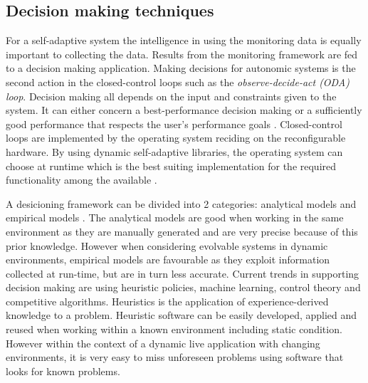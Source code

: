 \subsection{Decision making techniques}
\label{sec:decisions}

For a self-adaptive system the intelligence in using the monitoring data is equally important to collecting the data. Results from the monitoring framework are fed to a decision making application. Making decisions for autonomic systems is the second action in the closed-control loops such as the \emph{observe-decide-act (ODA) loop}. Decision making all depends on the input and constraints given to the system. It can either concern a best-performance decision making or a sufficiently good performance that respects the user's performance goals \cite{evolvable}. Closed-control loops are implemented by the operating system reciding on the reconfigurable hardware. By using dynamic self-adaptive libraries, the operating system can choose at runtime which is the best suiting implementation for the required functionality among the available \cite{evolvable}.

A desicioning framework can be divided into 2 categories: analytical models and empirical models \cite{evolvable}. The analytical models are good when working in the same environment as they are manually generated and are very precise because of this prior knowledge. However when considering evolvable systems in dynamic environments, empirical models are favourable as they exploit information collected at run-time, but are in turn less accurate.
Current trends in supporting decision making are using heuristic policies, machine learning, control theory and competitive algorithms. Heuristics is the application of experience-derived knowledge to a problem. Heuristic software can be easily developed, applied and reused when working within a known environment including static condition. However within the context of a dynamic live application with changing environments, it is very easy to miss unforeseen problems using software that looks for known problems.

